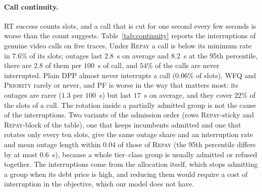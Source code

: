 \documentclass[preprint,11pt]{elsarticle}
\theoremstyle{definition}
\theoremstyle{remark}
\newcommand{\rmin}{r^{\min}}
\newcommand{\repay}{\textsc{Repay}}
\begin{document}
\paragraph{Call continuity.}
RT success counts slots, and a call that is cut for one second every few seconds is worse than the count suggests.
Table~\ref{tab:continuity} reports the interruptions of genuine video calls on five traces.
Under \repay{} a call is below its minimum rate in $7.6\%$ of its slots; outages last $2.8$~s on average and $8.2$~s at the 95th percentile, there are $2.8$ of them per $100$~s of call, and $54\%$ of the calls are never interrupted.
Plain DPP almost never interrupts a call ($0.06\%$ of slots), \textsc{WFQ} and \textsc{Priority} rarely or never, and \textsc{PF} is worse in the way that matters most: its outages are rarer ($1.3$ per $100$~s) but last $17$~s on average, and they cover $22\%$ of the slots of a call.
The rotation inside a partially admitted group is not the cause of the interruptions. Two variants of the admission order (rows \textsc{Repay}-sticky and \textsc{Repay}-block of the table), one that keeps incumbents admitted and one that rotates only every ten slots, give the same outage share and an interruption rate and mean outage length within $0.04$ of those of \repay{} (the 95th percentile differs by at most $0.6$~s), because a whole tier--class group is usually admitted or refused together.
The interruptions come from the allocation itself, which stops admitting a group when its debt price is high, and reducing them would require a cost of interruption in the objective, which our model does not have.

\begin{table}[t]
\centering
\caption{Interruptions of genuine video calls (hotspot, truthful devices, five traces). An outage is a maximal run of slots below $\rmin_{\mathrm{v}}$.}
\label{tab:continuity}
\end{table}
\end{document}

